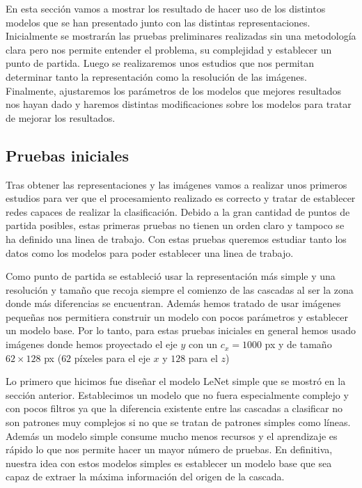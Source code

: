 \documentclass[a4paper,12pt,twoside,titlepage]{article}
\begin{document}
En esta sección vamos a mostrar los resultado de hacer uso de los distintos modelos que se han presentado junto con las distintas representaciones. Inicialmente se mostrarán las pruebas preliminares realizadas sin una metodología clara pero nos permite entender el problema, su complejidad y establecer un punto de partida. Luego se realizaremos unos estudios que nos permitan determinar tanto la representación como la resolución de las imágenes. Finalmente, ajustaremos los parámetros de los modelos que mejores resultados nos hayan dado y haremos distintas modificaciones sobre los modelos para tratar de mejorar los resultados.

\subsection{Pruebas iniciales}
\label{sec:pruebas_iniciales}
Tras obtener las representaciones y las imágenes vamos a realizar unos primeros estudios para ver que el procesamiento realizado es correcto y tratar de establecer redes capaces de realizar la clasificación. Debido a la gran cantidad de puntos de partida posibles, estas primeras pruebas no tienen un orden claro y tampoco se ha definido una linea de trabajo. Con estas pruebas queremos estudiar tanto los datos como los modelos para poder establecer una linea de trabajo.

Como punto de partida se estableció usar la representación más simple y una resolución y tamaño que recoja siempre el comienzo de las cascadas al ser la zona donde más diferencias se encuentran. Además hemos tratado de usar imágenes pequeñas nos permitiera construir un modelo con pocos parámetros y establecer un modelo base. Por lo tanto, para estas pruebas iniciales en general hemos usado imágenes donde hemos proyectado el eje $y$ con un $c_x = 1000$ px y de tamaño $62 \times 128$ px ($62$ píxeles para el eje $x$ y $128$ para el $z$)

Lo primero que hicimos fue diseñar el modelo LeNet simple que se mostró en la sección anterior. Establecimos un modelo que no fuera especialmente complejo y con pocos filtros ya que la diferencia existente entre las cascadas a clasificar no son patrones muy complejos si no que se tratan de patrones simples como líneas. Además un modelo simple consume mucho menos recursos y el aprendizaje es rápido lo que nos permite hacer un mayor número de pruebas. En definitiva, nuestra idea con estos modelos simples es establecer un modelo base que sea capaz de extraer la máxima información del origen de la cascada.
\end{document}
